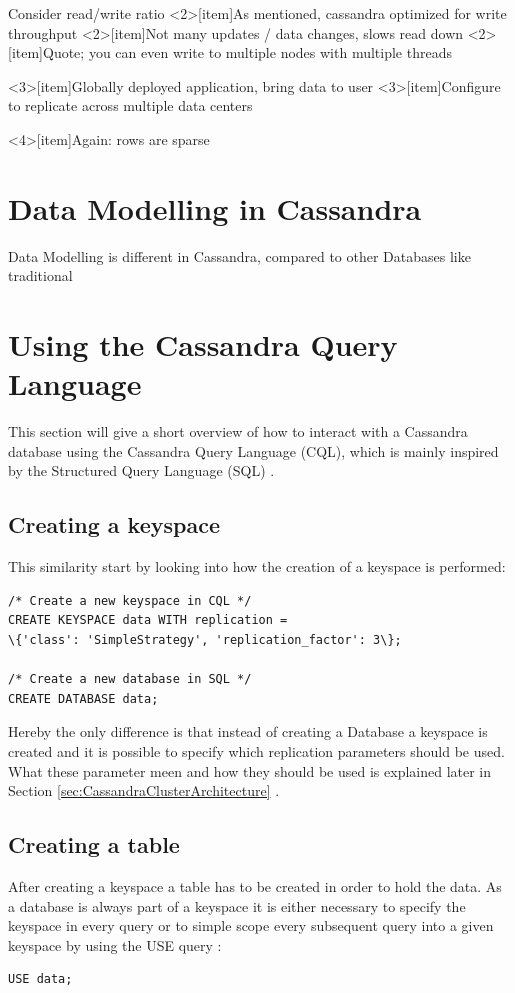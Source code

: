 {Consider read/write ratio}
    <2>[item]{As mentioned, cassandra optimized for write throughput}
    <2>[item]{Not many updates / data changes, slows read down}
    <2>[item]{Quote; you can even write to multiple nodes with multiple threads}

    <3>[item]{Globally deployed application, bring data to user}
    <3>[item]{Configure to replicate across multiple data centers}

    <4>[item]{Again: rows are sparse}


\section{Data Modelling in Cassandra}  %



Data Modelling is different in Cassandra, compared to other Databases like traditional

\section{Using the Cassandra Query Language}  %
This section will give a short overview of how to interact with a Cassandra database using the Cassandra Query Language (CQL), which is mainly inspired by the Structured Query Language (SQL) \autocite{cqlAlexMeng, newInCQL3, cassandra3cqldocCreateKeystore}.

\subsection {Creating a keyspace}
This similarity start by looking into how the creation of a keyspace is performed:
\begin{verbatim}
/* Create a new keyspace in CQL */
CREATE KEYSPACE data WITH replication =
\{'class': 'SimpleStrategy', 'replication_factor': 3\};

/* Create a new database in SQL */
CREATE DATABASE data;
\end{verbatim}
Hereby the only difference is that instead of creating a Database a keyspace is created and it is possible to specify which replication parameters should be used. What these parameter meen and how they should be used is explained later in Section \ref{sec:CassandraClusterArchitecture} \autocite{cqlAlexMeng}.

\subsection{Creating a table}
After creating a keyspace a table has to be created in order to hold the data. As a database is always part of a keyspace it is either necessary to specify the keyspace in every query or to simple scope every subsequent query into a given keyspace by using the USE query \autocite{cassandra3cqldocUse}:
\begin{verbatim}
USE data;
\end{verbatim}

